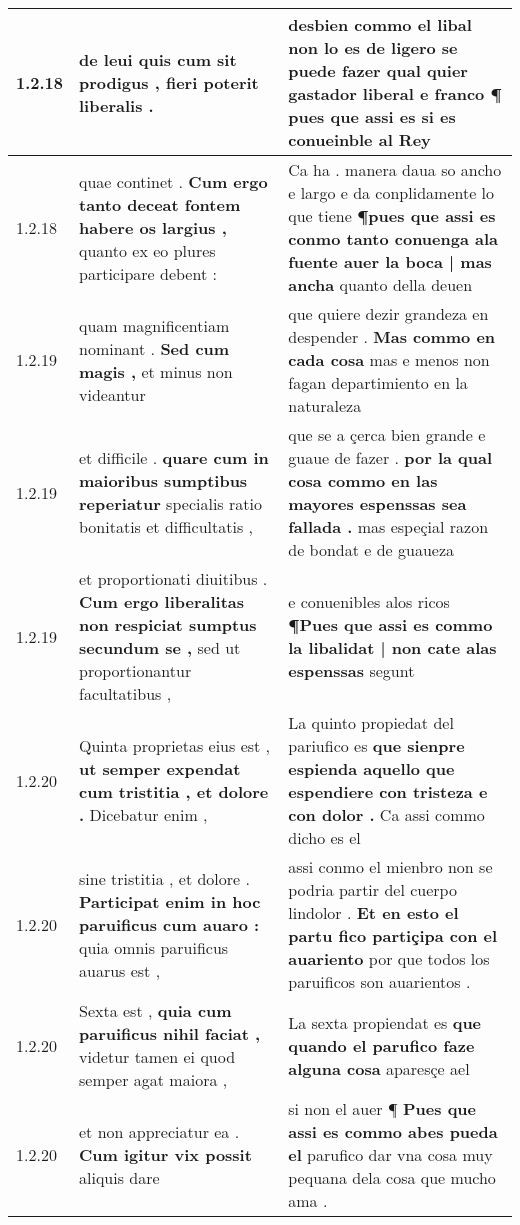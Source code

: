 \begin{tabular}{|p{1cm}|p{6.5cm}|p{6.5cm}|}
1.2.18 & de leui \textbf{ quis cum sit prodigus , } fieri poterit liberalis . & desbien commo el libal non lo es de ligero se puede fazer \textbf{ qual quier gastador liberal e franco ¶ } pues que assi es si es conueinble al Rey \\\hline
1.2.18 & quae continet . \textbf{ Cum ergo tanto deceat fontem habere os largius , } quanto ex eo plures participare debent : & Ca ha . manera daua so ancho e largo e da conplidamente lo que tiene \textbf{ ¶pues que assi es conmo tanto conuenga ala fuente auer la boca | mas ancha } quanto della deuen \\\hline
1.2.19 & quam magnificentiam nominant . \textbf{ Sed cum magis , } et minus non videantur & que quiere dezir grandeza en despender . \textbf{ Mas commo en cada cosa } mas e menos non fagan departimiento en la naturaleza \\\hline
1.2.19 & et difficile . \textbf{ quare cum in maioribus sumptibus reperiatur } specialis ratio bonitatis et difficultatis , & que se a çerca bien grande e guaue de fazer . \textbf{ por la qual cosa commo en las mayores espenssas sea fallada . } mas espeçial razon de bondat e de guaueza \\\hline
1.2.19 & et proportionati diuitibus . \textbf{ Cum ergo liberalitas non respiciat sumptus secundum se , } sed ut proportionantur facultatibus , & e conuenibles alos ricos \textbf{ ¶Pues que assi es commo la libalidat | non cate alas espenssas } segunt \\\hline
1.2.20 & Quinta proprietas eius est , \textbf{ ut semper expendat cum tristitia , et dolore . } Dicebatur enim , & La quinto propiedat del pariufico es \textbf{ que sienpre espienda aquello que espendiere con tristeza e con dolor . } Ca assi commo dicho es el \\\hline
1.2.20 & sine tristitia , et dolore . \textbf{ Participat enim in hoc paruificus cum auaro : } quia omnis paruificus auarus est , & assi conmo el mienbro non se podria partir del cuerpo lindolor . \textbf{ Et en esto el partu fico partiçipa con el auariento } por que todos los paruificos son auarientos . \\\hline
1.2.20 & Sexta est , \textbf{ quia cum paruificus nihil faciat , } videtur tamen ei quod semper agat maiora , & La sexta propiendat es \textbf{ que quando el parufico faze alguna cosa } aparesçe ael \\\hline
1.2.20 & et non appreciatur ea . \textbf{ Cum igitur vix possit } aliquis dare & si non el auer ¶ \textbf{ Pues que assi es commo abes pueda el } parufico dar vna cosa muy pequana dela cosa que mucho ama . \\\hline

\end{tabular}
